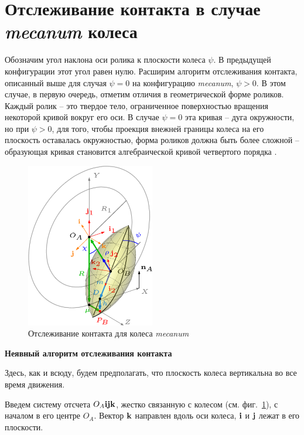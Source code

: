 \section{Отслеживание контакта в случае \textit{mecanum} колеса}

Обозначим угол наклона оси ролика к плоскости колеса $\psi$. В предыдущей конфигурации этот угол равен нулю. Расширим алгоритм отслеживания контакта, описанный выше для случая $\psi = 0$ на конфигурацию \textit{mecanum}, $\psi > 0$. В этом случае, в первую очередь, отметим отличия в геометрической форме роликов. Каждый ролик -- это твердое тело, ограниченное поверхностью вращения некоторой кривой вокруг его оси. В случае $\psi = 0$ эта кривая -- дуга окружности, но при $\psi > 0$, для того, чтобы проекция внежней границы колеса на его плоскость оставалась окружностью, форма роликов должна быть более сложной -- образующая кривая становится алгебраической кривой четвертого порядка \cite{Gfrerrer2008}.

\begin{figure}[H]
    \centering
    \includegraphics[width=0.5\textwidth]{./content/pic/asy/pic_mecanum.png}
    \caption{Отслеживание контакта для колеса \textit{mecanum}}
    \label{fig:mecanum}
\end{figure}

\textbf{Неявный алгоритм отслеживания контакта}

Здесь, как и всюду, будем предполагать, что плоскость колеса вертикальна во все время движения.

Введем систему отсчета $O_A{\bf i}{\bf j}{\bf k}$, жестко связанную с колесом (см. фиг.~\ref{fig:mecanum}), с началом в его центре $O_A$. Вектор ${\bf k}$ направлен вдоль оси колеса, ${\bf i}$ и ${\bf j}$ лежат в его плоскости.

